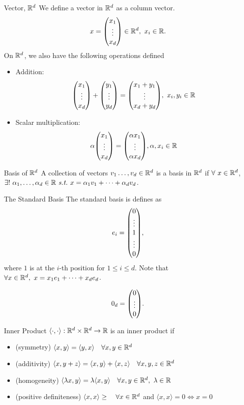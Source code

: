 \begin{df}{Vector, ${\mathbb{R}}^d$}
	We define a vector in ${\mathbb{R}}^d$ as a column vector. \[x=\mqty(x_1\\\vdots\\x_d)\in\R^d,\ x_i\in\R.\] On ${\mathbb{R}}^d$, we also have the following operations defined
	\begin{itemize}
		\item Addition: \[\mqty(x_1\\\vdots\\x_d)+\mqty(y_1\\\vdots\\y_d)=\mqty(x_1+y_1\\\vdots\\x_d+y_d),\ x_i,y_i\in\R\]
		\item Scalar multiplication: \[\alpha\mqty(x_1\\\vdots\\x_d)=\mqty(\alpha x_1\\\vdots\\\alpha x_d),\alpha,x_i\in\R\]
	\end{itemize}
\end{df}
\begin{df}{Basis of ${\mathbb{R}}^d$}
	A collection of vectors $v_1\dots,v_d\in{\mathbb{R}}^d$ is a basis in ${\mathbb{R}}^d$ if $\forall\ x\in\R^d$, $\exists!\ \alpha_1,\dots,\alpha_d\in\R\st x=\alpha_1v_1+\cdots+\alpha_dv_d$.	
\end{df}
\begin{eg}{The Standard Basis}
	The standard basis is defines as \[e_i=\mqty(0\\\vdots\\1\\\vdots\\0),\]	 where $1$ is at the $i$-th position for $1\leq i\leq d$. Note that $\forall x\in\R^d,\ x=x_1e_1+\cdots+x_de_d$.
\end{eg}
\begin{nota}
	\[0_d=\mqty(0\\\vdots\\0).\]	
\end{nota}
\begin{df}{Inner Product}
	$\left\langle \cdot, \cdot \right\rangle:{\mathbb{R}}^d\times{\mathbb{R}}^d\to{\mathbb{R}}$ is an inner product if
	\begin{itemize}
		\item (symmetry) $\langle x,y\rangle=\langle y,x\rangle\quad\forall x,y\in{\mathbb{R}}^d$
		\item (additivity) $\langle x,y+z\rangle=\langle x,y\rangle+\langle x,z\rangle\quad\forall x,y,z\in{\mathbb{R}}^d$
		\item (homogeneity) $\langle\lambda x,y\rangle=\lambda\langle x,y\rangle\quad\forall x,y\in\R^d,\ \lambda\in\R$
		\item (positive definiteness) $\langle x,x\rangle\geq\quad\forall x\in{\mathbb{R}}^d$ and $\langle x,x\rangle=0\iff x=0$
	\end{itemize}
\end{df}

